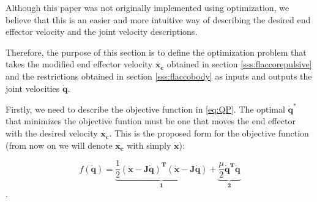 Although this paper was not originally implemented using optimization, we believe that this  is an easier and more intuitive way of describing the desired end effector velocity and the joint velocity descriptions.

Therefore, the purpose of this section is to define the optimization problem that takes the modified end effector velocity $\mathbf{\dot{x_c}}$ obtained in section \ref{sss:flaccorepulsive} and the restrictions obtained in section \ref{sss:flaccobody} as inputs and outputs the joint velocities $\dot{\mathbf{q}}$.

Firstly, we need to describe the objective function in \ref{eq:QP}. The optimal $\dot{\mathbf{q}}^*$ that minimizes the objective funtion must be one that moves the end effector with the desired velocity $\mathbf{\dot{x_c}}$. This is the proposed form for the objective function (from now on we will denote $\mathbf{\dot{x_c}}$ with simply $\mathbf{\dot{x}}$):

\begin{equation*}
    f(\dot{\mathbf{q}}) = \underbrace{\frac{1}{2} \mathbf{(\dot{x}-J\dot{q})^{T} (\dot{x}-J\dot{q})}}_\textbf{1} + \underbrace{\frac{\mu}{2} \mathbf{\dot{q}^{T} \dot{q}}}_\textbf{2}
\end{equation*}.

